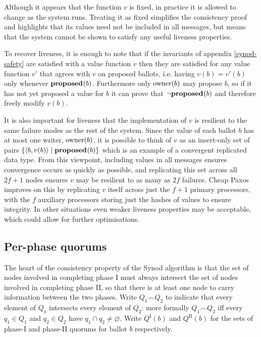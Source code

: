 \documentclass[journal]{IEEEtran}
\begin{document}
Although it appears that the function $v$ is fixed, in practice it is allowed
to change as the system runs. Treating it as fixed simplifies the consistency
proof and highlights that its values need not be included in all messages, but
means that the system cannot be shown to satisfy any useful liveness
properties.

To recover liveness, it is enough to note that if the invariants of appendix
\ref{synod-safety} are satisfied with a value function $v$ then they are
satisfied for any value function $v'$ that agrees with $v$ on proposed ballots,
i.e. having $v(b) = v'(b)$ only whenever $\mathbf{proposed}_{}(b)$.  Furthermore only
$\mathrm{owner}(b)$ may propose $b$, so if it has not yet proposed a value for $b$ it
can prove that $\neg\mathbf{proposed}_{}(b)$ and therefore freely modify $v(b)$.

It is also important for liveness that the implementation of $v$ is resilient
to the same failure modes as the rest of the system. Since the value of each
ballot $b$ has at most one writer, $\mathrm{owner}(b)$, it is possible to think of
$v$ as an insert-only set of pairs ${\{ \langle b, v(b) \rangle \mid \mathbf{proposed}_{}(b)
\}}$ which is an example of a convergent replicated data type\cite{crdts}.
From this viewpoint, including values in all messages ensures convergence
occurs as quickly as possible, and replicating this set across all ${2f+1}$
nodes ensures $v$ may be resilient to as many as $2f$ failures. Cheap Paxos
improves on this by replicating $v$ itself across just the ${f+1}$ primary
processors, with the $f$ auxiliary processors storing just the hashes of values
to ensure integrity.  In other situations even weaker liveness properties may
be acceptable, which could allow for further optimisations.

\subsection{Per-phase quorums}\label{per-phase-quorums}

The heart of the consistency property of the Synod algorithm is that the set of
nodes involved in completing phase I must always intersect the set of nodes
involved in completing phase II, so that there is at least one node to carry
information between the two phases. Write $Q_1 \frown Q_2$ to indicate that
every element of $Q_1$ intersects every element of $Q_2$: more formally $Q_1
\frown Q_2$ iff every $q_1 \in Q_1$ and $q_2 \in Q_2$ have ${q_1 \cap q_2 \ne
\varnothing}$. Write $Q^\textrm{I}(b)$ and $Q^\textrm{II}(b)$ for the sets of
phase-I and phase-II quorums for ballot $b$ respectively.
\end{document}
